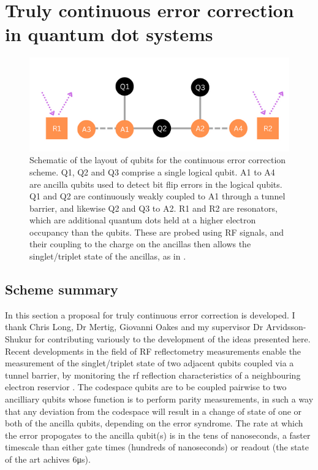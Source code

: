 \documentclass{report}
\begin{document}
\section{Truly continuous error correction in quantum dot systems} \label{sec:truly_continuous_theory}
\begin{figure}[h]
    \centering
    \includegraphics[scale = 1]{Figures/7qubitlayout.png}
    \caption{Schematic of the layout of qubits for the continuous error correction scheme. Q1, Q2 and Q3 comprise a single logical qubit. A1 to A4 are ancilla qubits used to detect bit flip errors in the logical qubits. Q1 and Q2 are continuously weakly coupled to A1 through a tunnel barrier, and likewise Q2 and Q3 to A2. R1 and R2 are resonators, which are additional quantum dots held at a higher electron occupancy than the qubits. These are probed using RF signals, and their coupling to the charge on the ancillas then allows the singlet/triplet state of the ancillas, as in \cite{Oakes2022}.}
    \label{fig:7qubitlayout}
\end{figure}
\subsection{Scheme summary}

In this section a proposal for truly continuous error correction is developed. I thank Chris Long, Dr Mertig, Giovanni Oakes and my supervisor Dr Arvidsson-Shukur for contributing variously to the development of the ideas presented here. Recent developments in the field of RF reflectometry measurements enable the measurement of the singlet/triplet state of two adjacent qubits coupled via a tunnel barrier, by monitoring the rf reflection characteristics of a neighbouring electron reservior \cite{Oakes2022}. The codespace qubits are to be coupled pairwise to two ancilliary qubits whose function is to perform parity measurements, in such a way that any deviation from the codespace will result in a change of state of one or both of the ancilla qubits, depending on the error syndrome. The rate at which the error propogates to the ancilla qubit(s) is in the tens of nanoseconds, a faster timescale than either gate times (hundreds of nanoseconds) or readout (the state of the art \cite{Oakes2022} achives 6\unit{\micro\second}). 
\end{document}
